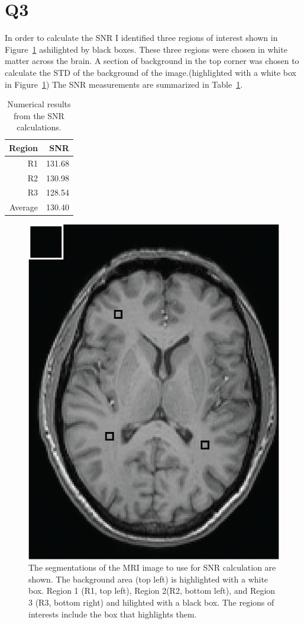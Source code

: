 \documentclass[12pt]{article}
\begin{document}
\section{Q3}
In order to calculate the SNR I identified three regions of interest shown in Figure~\ref{Fig:segment} ashilighted by black boxes. These three regions were chosen in white matter across the brain. A section of background in the top corner was chosen to calculate the STD of the background of the image.(highlighted with a white box in Figure~\ref{Fig:segment}) The SNR measurements are summarized in Table~\ref{tab:snr}.
\begin{table}[H]
	\vspace{-.1in}
	\caption{\label{tab:snr} Numerical results from the SNR calculations.}
	\centering
	\begin{tabular}{|r|r|} \hline
		Region&SNR\\
		\hline
		R1&131.68\\
		R2&130.98\\
		R3&128.54\\
		Average&130.40\\
		\hline
		
		\hline
		
	\end{tabular}
\end{table}
\begin{figure}[h]
	\centering
	\includegraphics[width=.7\textwidth]{Figures/segment.png}
	\caption{The segmentations of the MRI image to use for SNR calculation are shown. The background area (top left) is highlighted with a white box. Region 1 (R1, top left), Region 2(R2, bottom left), and Region 3 (R3, bottom right) and hilighted with a black box. The regions of interests include the box that highlights them.}
	\label{Fig:segment}
\end{figure}
\end{document}
